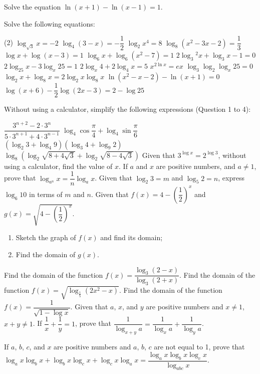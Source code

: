 \documentclass{report}
\begin{document}
			Solve the equation $\ln (x+1)-\ln (x-1)=1$.
			
			Solve the following equations:
			\begin{tasks}[label=\arabic*.](2)
				\task $\log _{\sqrt{3}} x=-2$
				\task $\log _4(3-x)=-\dfrac{1}{2}$
				\task $\log _2 x^4=8$
				\task $\log _8\left(x^2-3 x-2\right)=\dfrac{1}{3}$
				\task $\log x+\log (x-3)=1$
				\task $\log _6 x+\log _6\left(x^2-7\right)=1$
				\task $2 \log _3{ }^2 x+\log _3 x-1=0$
				\task $2 \log _{25} x-3 \log _x 25=1$
				\task $2 \log _x 4+2 \log _4 x=5$
				\task $x^{2 \ln x}=e x$
				\task $\log _3 \log _2 \log _x 25=0$
				\task $\log _2 x+\log _8 x=2 \log _2 x \log _8 x$
				\task $\ln \left(x^2-x-2\right)-\ln (x+1)=0$
				\task $\log (x+6)-\dfrac{1}{2} \log (2 x-3)=2-\log 25$
			\end{tasks}
			
			\revision{12}
			Without using a calculator, simplify the following expressions (Question 1 to 4):
			\begin{tasks}[label=\arabic*.]
				\task $\dfrac{3^{n+2}-2 \cdot 3^n}{5 \cdot 3^{n+1}+4 \cdot 3^{n-1}}$
				\task $\log _4 \cos \dfrac{\pi}{4}+\log _4 \sin \dfrac{\pi}{6}$
				\task $\left(\log _2 3+\log _4 9\right)\left(\log _3 4+\log _9 2\right)$
				\task $\log _8\left(\log _2 \sqrt{8+4 \sqrt{3}}+\log _2 \sqrt{8-4 \sqrt{3}}\right)$
				\task Given that $3^{\log x}=2^{\log 3}$, without using a calculator, find the value of $x$.
				\task If $a$ and $x$ are positive numbers, and $a \neq 1$, prove that $\log _{a^n} x=\dfrac{1}{n} \log _a x$.
				\task Given that $
				\log _2 3=m$ and $\log _5 2=n$, express $\log _6 10$ in terms of $m$ and $n$.
				\task Given that $f(x)=4-\left(\dfrac{1}{2}\right)^x$ and $g(x)=\sqrt{4-\left(\dfrac{1}{2}\right)^x}$.
				\begin{enumerate}[label=(\alph*)]
					\item Sketch the graph of $f(x)$ and find its domain;
					\item Find the domain of $g(x)$.
				\end{enumerate}
				\task Find the domain of the function $f(x)=\dfrac{\log _3(2-x)}{\log _3(2+x)}$.
				\task Find the domain of the function $f(x)=\sqrt{\log _{\frac{1}{5}}\left(2 x^2-x\right)}$.
				\task Find the domain of the function $f(x)=\dfrac{1}{\sqrt{1-\log x}}$.
				\task Given that $a$, $x$, and $y$ are positive numbers and $x \neq 1$, $x+y \neq 1$. If $\dfrac{1}{x}+\dfrac{1}{y}=1$, prove that $\dfrac{1}{\log _{x+y} a}=\dfrac{1}{\log _x a}+\dfrac{1}{\log _y a}$.
				
				\task If $a$, $b$, $c$, and $x$ are positive numbers and $a$, $b$, $c$ are not equal to 1, prove that $\log _a x \log _b x+\log _b x \log _c x+\log _c x \log _a x=\dfrac{\log _a x \log _b x \log _c x}{\log _{a b c} x}$.
			\end{tasks}
			
\end{document}
